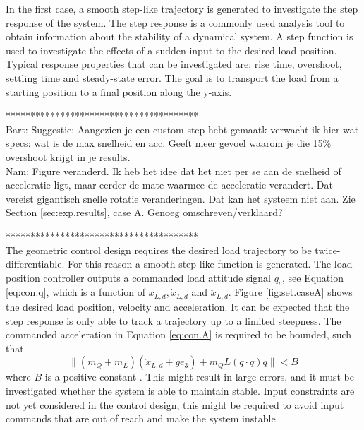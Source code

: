 In the first case, a smooth step-like trajectory is generated to investigate the step response of the system.
The step response is a commonly used analysis tool to obtain information about the stability of a dynamical system.
A step function is used to investigate the effects of a sudden input to the desired load position.
Typical response properties that can be investigated are: rise time, overshoot, settling time and steady-state error.
The goal is to transport the load from a starting position to a final position along the y-axis. 

***************************************\\
Bart: Suggestie: Aangezien je een custom step hebt gemaatk verwacht ik hier wat specs: wat is de max snelheid en acc. Geeft meer gevoel waarom je die 15\% overshoot krijgt in je results.
\\
Nam: Figure veranderd. Ik heb het idee dat het niet per se aan de snelheid of acceleratie ligt, maar eerder de mate waarmee de acceleratie verandert. Dat vereist gigantisch snelle rotatie veranderingen. Dat kan het systeem niet aan. Zie Section \ref{sec:exp.results}, case A. Genoeg omschreven/verklaard?

***************************************\\

The geometric control design requires the desired load trajectory to be twice-differentiable. For this reason a smooth step-like function is generated.
The load position controller outputs a commanded load attitude signal $ q_c $, see Equation \ref{eq:con.q}, 
which is a function of $x_{L,d}, \dot{x}_{L,d} $ and $ \ddot{x}_{L,d} $. Figure \ref{fig:set.caseA} shows the desired load position, velocity and acceleration.
It can be expected that the step response is only able to track a trajectory up to a limited steepness. 
The commanded acceleration in Equation \ref{eq:con.A} is required to be bounded, such that 
\begin{equation}\label{eq:set.acc}
\parallel (m_Q+m_L)(\ddot{x}_{L,d}+ge_3)+m_QL(\dot{q}\cdot\dot{q})q \parallel < B
\end{equation}
where $ B $ is a positive constant \cite{Lee2010}. 
This might result in large errors, and it must be investigated whether the system is able to maintain stable. Input constraints are not yet considered in the control design, this might be required to avoid input commands that are out of reach and make the system instable.

